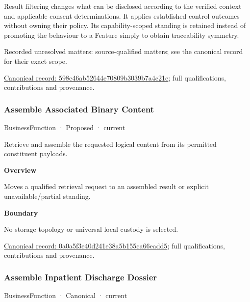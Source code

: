 Result filtering changes what can be disclosed according to the verified context and applicable consent determinations. It applies established control outcomes without owning their policy. Its capability-scoped standing is retained instead of promoting the behaviour to a Feature simply to obtain traceability symmetry.


{\small Recorded unresolved matters: source-qualified matters; see the canonical record for their exact scope.}\par
{\footnotesize \href{../../../../continuum/business/business-function/598e46ab52644e70809b3039b7a4c21e.md}{Canonical record: 598e46ab52644e70809b3039b7a4c21e}; full qualifications, contributions and provenance.}\par
\subsubsection{Assemble Associated Binary Content}

\label{element:0a0a5f3e40d241e38a5b155ca66eadd5}
{\small BusinessFunction · Proposed · current}\par

Retrieve and assemble the requested logical content from its permitted constituent payloads.



\textbf{Overview}



Moves a qualified retrieval request to an assembled result or explicit unavailable/partial standing.



\textbf{Boundary}



No storage topology or universal local custody is selected.


{\footnotesize \href{../../../../continuum/business/business-function/0a0a5f3e40d241e38a5b155ca66eadd5.md}{Canonical record: 0a0a5f3e40d241e38a5b155ca66eadd5}; full qualifications, contributions and provenance.}\par
\subsubsection{Assemble Inpatient Discharge Dossier}

\label{element:eeefe77a935a46aface61aca4e2bcfb6}
{\small BusinessFunction · Canonical · current}\par


